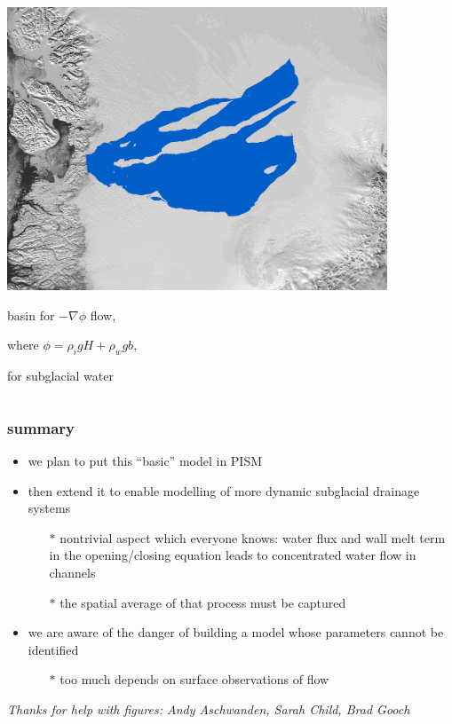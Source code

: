 \documentclass[hide notes,intlimits]{beamer}
\begin{document}
\begin{frame}
\begin{columns}
\begin{column}{0.5\textwidth}
\begin{center}
\includegraphics[width=0.85\textwidth]{figs/hydro-mask}

basin for $-\nabla \phi$ flow,

where $\phi = \rho_i g H + \rho_w g b$,

for subglacial water
\end{center}
\end{column}
\end{columns}

\end{frame}


{
} 


\begin{frame}
  \frametitle{summary}

  \begin{itemize}
  \item we plan to put this ``basic'' model in PISM
  \item then extend it to enable modelling of more dynamic subglacial drainage systems
    \begin{itemize}
    \small
    \item[$\ast$] nontrivial aspect which everyone knows: water flux and wall melt term in the opening/closing equation  leads to concentrated water flow in channels
    \item[$\ast$] the spatial average of that process must be captured
    \end{itemize}
    \normalsize
  \item we are aware of the danger of building a model whose parameters cannot be identified
    \begin{itemize}
    \small
    \item[$\ast$] too much depends on surface observations of flow
    \end{itemize}
    \normalsize
  \end{itemize}

\vspace{17mm}
  \begin{center}
  \tiny \emph{Thanks for help with figures: Andy Aschwanden, Sarah Child, Brad Gooch}
  \end{center}
\end{frame}
\end{document}
